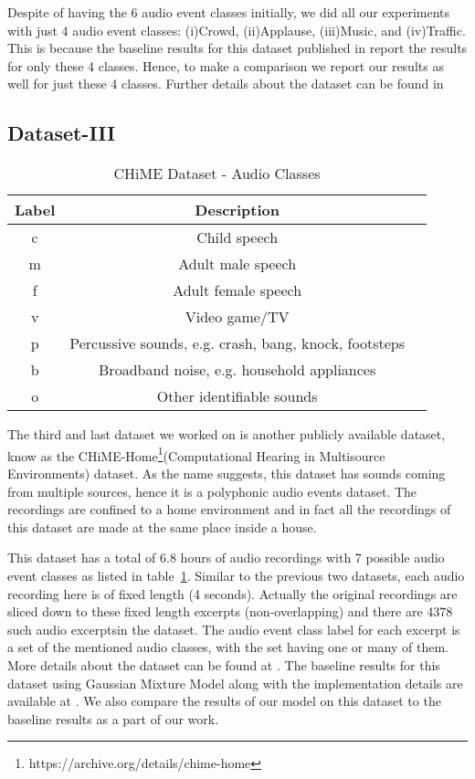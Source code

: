 Despite of having the 6 audio event classes initially, we did all our experiments with just 4 audio event classes: (i)Crowd, (ii)Applause, (iii)Music, and (iv)Traffic. This is because the baseline results for this dataset published in \cite{kons2013audio} report the results for only these 4 classes. Hence, to make a comparison we report our results as well for just these 4 classes. Further details about the dataset can be found in \cite{kons2013audio}

\subsection{Dataset-III}

\begin{table}[!htb]
\caption[CHiME Dataset - Audio Classes]{CHiME Dataset - Audio Classes}
\label{tab:audio_classes_db3_bkg}
\centering
\begin{tabular}{ccc}
\toprule
Label & Description  \\
\midrule
c	& Child speech\\
m	& Adult male speech\\
f & Adult female speech\\
v 	& Video game/TV\\
p & Percussive sounds, e.g. crash, bang, knock, footsteps\\
b & Broadband noise, e.g. household appliances\\
o & Other identifiable sounds\\
\bottomrule 
\end{tabular}
\end{table}

The third and last dataset we worked on is another publicly available dataset, know as the CHiME-Home\footnote{https://archive.org/details/chime-home}(Computational Hearing in  Multisource Environments) dataset. As the name suggests, this dataset has sounds coming from multiple sources, hence it is a polyphonic audio events dataset. The recordings are confined to a home environment and in fact all the recordings of this dataset are made at the same place inside a house. 

This dataset has a total of 6.8 hours of audio recordings with 7 possible audio event classes as listed in table~\ref{tab:audio_classes_db3_bkg}. Similar to the previous two datasets, each audio recording here is of fixed length (4 seconds). Actually the original recordings are sliced down to these fixed length excerpts (non-overlapping) and there are 4378 such audio excerptsin the dataset. The audio event class label for each excerpt is a set of the mentioned audio classes, with the set having one or many of them. More details about the dataset can be found at \cite{christensen2010chime}. The baseline results for this dataset using Gaussian Mixture Model along with the implementation details are available at \cite{foster2015chime}. We also compare the results of our model on this dataset to the baseline results as a part of our work.
